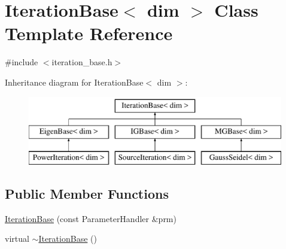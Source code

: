 \hypertarget{class_iteration_base}{}\section{Iteration\+Base$<$ dim $>$ Class Template Reference}
\label{class_iteration_base}


{\ttfamily \#include $<$iteration\+\_\+base.\+h$>$}

Inheritance diagram for Iteration\+Base$<$ dim $>$\+:\begin{figure}[H]
\begin{center}
\leavevmode
\includegraphics[height=3.000000cm]{class_iteration_base}
\end{center}
\end{figure}
\subsection*{Public Member Functions}
\begin{DoxyCompactItemize}
\item 
\hyperlink{class_iteration_base_a385009434fcdf512953f317088e09b0b}{Iteration\+Base} (const Parameter\+Handler \&prm)
\item 
virtual \hyperlink{class_iteration_base_a942860f3a03d46da883c1c6c430bea55}{$\sim$\+Iteration\+Base} ()
\end{DoxyCompactItemize}
